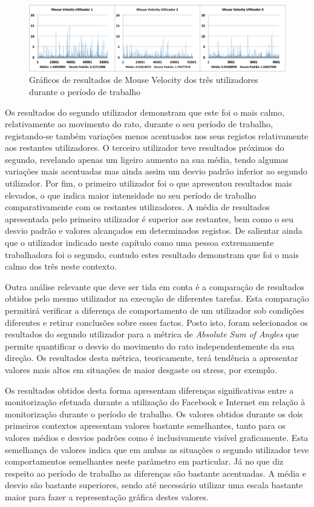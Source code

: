  \begin{figure}[htb]
   \centering
   \includegraphics[scale=0.363]{Images/mousevelocity1.png}
   \caption{Gráficos de resultados de Mouse Velocity dos três utilizadores durante o período de trabalho}
\end{figure}

Os resultados do segundo utilizador demonstram que este foi o mais calmo, relativamente ao movimento do rato, durante o seu período de trabalho, registando-se também variações menos acentuados nos seus registos relativamente aos restantes utilizadores. O terceiro utilizador teve resultados próximos do segundo, revelando apenas um ligeiro aumento na sua média, tendo algumas variações mais acentuadas mas ainda assim um desvio padrão inferior ao segundo utilizador. Por fim, o primeiro utilizador foi o que apresentou resultados mais elevados, o que indica maior intensidade no seu período de trabalho comparativamente com os restantes utilizadores. A média de resultados apresentada pelo primeiro utilizador é superior aos restantes, bem como o seu desvio padrão e valores alcançados em determinados registos. De salientar ainda que o utilizador indicado neste capítulo como uma pessoa extremamente trabalhadora foi o segundo, contudo estes resultado demonstram que foi o mais calmo dos três neste contexto.



Outra análise relevante que deve ser tida em conta é a comparação de resultados obtidos pelo mesmo utilizador na execução de diferentes tarefas. Esta comparação permitirá verificar a diferença de comportamento de um utilizador sob condições diferentes e retirar conclusões sobre esses factos. Posto isto, foram selecionados os resultados do segundo utilizador para a métrica de \textit{Absolute Sum of Angles} que permite quantificar o desvio do movimento do rato independentemente da sua direção. Os resultados desta métrica, teoricamente, terá tendência a apresentar valores mais altos em situações de maior desgaste ou stress, por exemplo.

Os resultados obtidos desta forma apresentam diferenças significativas entre a monitorização efetuada durante a utilização do Facebook e Internet em relação à monitorização durante o período de trabalho. Os valores obtidos durante os dois primeiros contextos apresentam valores bastante semelhantes, tanto para os valores médios e desvios padrões como é inclusivamente visível graficamente. Esta semelhança de valores indica que em ambas as situações o segundo utilizador teve comportamentos semelhantes neste parâmetro em particular. Já no que diz respeito ao período de trabalho as diferenças são bastante acentuadas. A média e desvio são bastante superiores, sendo até necessário utilizar uma escala bastante maior para fazer a representação gráfica destes valores. 

